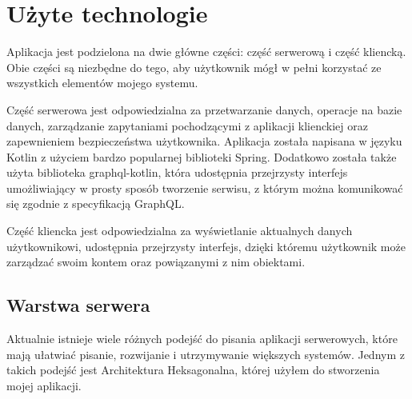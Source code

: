\newpage
\section{Użyte technologie}
Aplikacja jest podzielona na dwie główne części: część serwerową i część kliencką. Obie części są niezbędne do tego, aby użytkownik mógł w pełni korzystać ze wszystkich elementów mojego systemu.

Część serwerowa jest odpowiedzialna za przetwarzanie danych, operacje na bazie danych, zarządzanie zapytaniami pochodzącymi z aplikacji klienckiej oraz zapewnieniem bezpieczeństwa użytkownika. Aplikacja została napisana w języku Kotlin z użyciem bardzo popularnej biblioteki Spring. Dodatkowo została także użyta biblioteka graphql-kotlin, która udostępnia przejrzysty interfejs umożliwiający w prosty sposób tworzenie serwisu, z którym można komunikować się zgodnie z specyfikacją GraphQL.


Część kliencka jest odpowiedzialna za wyświetlanie aktualnych danych użytkownikowi, udostępnia przejrzysty interfejs, dzięki któremu użytkownik może zarządzać swoim kontem oraz powiązanymi z nim obiektami. 


\subsection{Warstwa serwera}
Aktualnie istnieje wiele różnych podejść do pisania aplikacji serwerowych, które mają ułatwiać pisanie, rozwijanie i utrzymywanie większych systemów. Jednym z takich podejść jest Architektura Heksagonalna, której użyłem do stworzenia mojej aplikacji.
